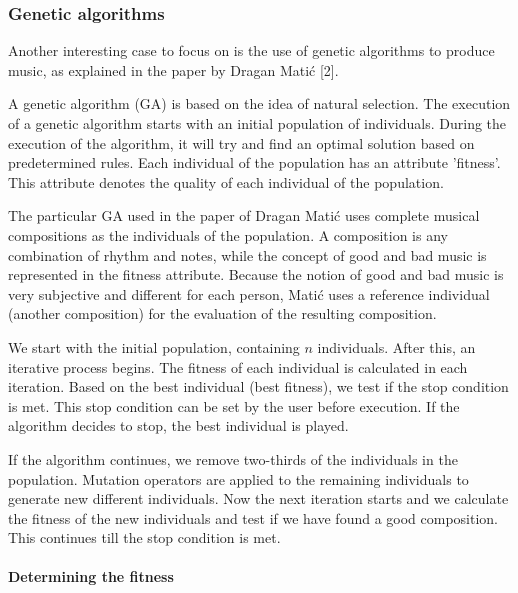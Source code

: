 \documentclass[12pt]{article}
\begin{document}
\subsubsection{Genetic algorithms}

Another interesting case to focus on is the use of genetic algorithms to produce music, as explained in the paper by Dragan Mati\'c [2].
\newline

A genetic algorithm (GA) is based on the idea of natural selection. The execution of a genetic algorithm starts with an initial population of individuals. During the execution of the algorithm, it will try and find an optimal solution based on predetermined rules. Each individual of the population has an attribute 'fitness'. This attribute denotes the quality of each individual of the population.
\newline

The particular GA used in the paper of Dragan Mati\'c uses complete musical compositions as the individuals of the population. A composition is any combination of rhythm and notes, while the concept of good and bad music is represented in the fitness attribute. Because the notion of good and bad music is very subjective and different for each person, Mati\'c uses a reference individual (another composition) for the evaluation of the resulting composition.
\newline

We start with the initial population, containing $n$ individuals. After this, an iterative process begins. The fitness of each individual is calculated in each iteration. Based on the best individual (best fitness), we test if the stop condition is met. This stop condition can be set by the user before execution. If the algorithm decides to stop, the best individual is played.
\newline

If the algorithm continues, we remove two-thirds of the individuals in the population. Mutation operators are applied to the remaining individuals to generate new different individuals. Now the next iteration starts and we calculate the fitness of the new individuals and test if we have found a good composition.
This continues till the stop condition is met.

\paragraph{Determining the fitness}
\end{document}
